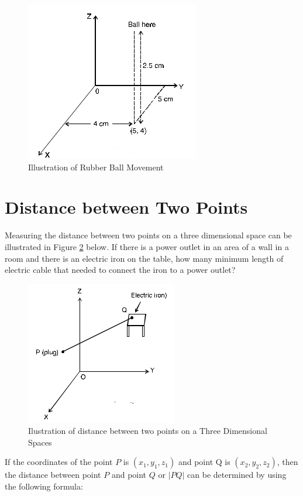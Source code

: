 \begin{figure}[h!]
	\centering
	\includegraphics[scale=1]{figure10.png}
	\caption{Illustration of Rubber Ball Movement}
	\label{fig:figure10}
\end{figure}

\section{Distance between Two Points}
Measuring the distance between two points on a three dimensional space can be illustrated in Figure \ref{fig:figure11} below. If there is a power outlet in an area of a wall in a room and there is an electric iron on the table, how many minimum length of electric cable that needed to connect the iron to a power outlet? 

\begin{figure}[h!]
	\centering
	\includegraphics[scale=1]{figure11.png}
	\caption{Ilustration of distance between two points on a Three Dimensional Spaces}
	\label{fig:figure11}
\end{figure}

If the coordinates of the point $P$ is $(x_1, y_1, z_1)$ and point Q is $(x_2, y_2, z_2)$, then the distance between point $P$ and point $Q$ or $|PQ|$ can be determined by using the following formula:


